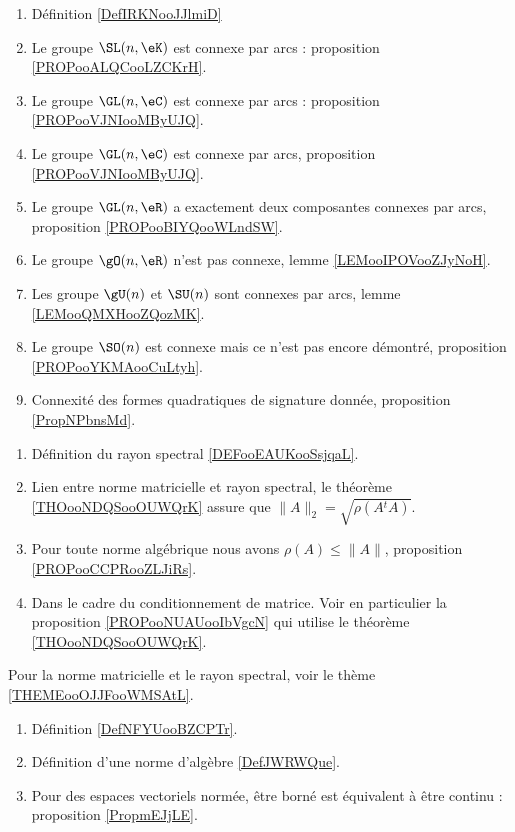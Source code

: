     \begin{enumerate}
        \item
            Définition \ref{DefIRKNooJJlmiD}
        \item
            Le groupe \( \SL(n,\eK)\) est connexe par arcs : proposition \ref{PROPooALQCooLZCKrH}.
        \item
            Le groupe \( \GL(n,\eC)\) est connexe par arcs : proposition \ref{PROPooVJNIooMByUJQ}.
        \item
            Le groupe \( \GL(n,\eC)\) est connexe par arcs, proposition \ref{PROPooVJNIooMByUJQ}.
        \item
            Le groupe \( \GL(n,\eR)\) a exactement deux composantes connexes par arcs, proposition \ref{PROPooBIYQooWLndSW}.
        \item
            Le groupe \( \gO(n,\eR)\) n'est pas connexe, lemme \ref{LEMooIPOVooZJyNoH}.
        \item
            Les groupe \( \gU(n)\) et \( \SU(n)\) sont connexes par arcs, lemme \ref{LEMooQMXHooZQozMK}.
        \item
            Le groupe \( \SO(n)\) est connexe mais ce n'est pas encore démontré, proposition \ref{PROPooYKMAooCuLtyh}.
        \item 
            Connexité des formes quadratiques de signature donnée, proposition \ref{PropNPbnsMd}.
        \end{enumerate}

             \label{THEMEooOJJFooWMSAtL}
    \begin{enumerate}
        \item
            Définition du rayon spectral \ref{DEFooEAUKooSsjqaL}.
        \item
            Lien entre norme matricielle et rayon spectral, le théorème \ref{THOooNDQSooOUWQrK} assure que $\|A\|_2=\sqrt{\rho(A{^t}A)}$.
        \item
            Pour toute norme algébrique nous avons \( \rho(A)\leq \| A \|\), proposition \ref{PROPooCCPRooZLJiRs}.
        \item
            Dans le cadre du conditionnement de matrice. Voir en particulier la proposition \ref{PROPooNUAUooIbVgcN} qui utilise le théorème \ref{THOooNDQSooOUWQrK}.
    \end{enumerate}

         \label{THEMEooHSLLooBQpFAr}
    Pour la norme matricielle et le rayon spectral, voir le thème \ref{THEMEooOJJFooWMSAtL}.
    \begin{enumerate}
        \item
            Définition \ref{DefNFYUooBZCPTr}.
        \item 
            Définition d'une norme d'algèbre \ref{DefJWRWQue}.
        \item
            Pour des espaces vectoriels normée, être borné est équivalent à être continu : proposition \ref{PropmEJjLE}.
    \end{enumerate}

